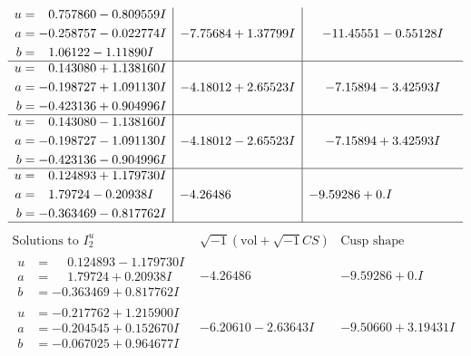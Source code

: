 \documentclass[1p]{elsarticle_modified}
\theoremstyle{definition}
\newcommand{\I}{\sqrt{-1}}
\begin{document}
$$\begin{array}{c|c|c}
\begin{aligned}
u &= \phantom{-}0.757860 - 0.809559 I \\
a &= -0.258757 - 0.022774 I \\
b &= \phantom{-}1.06122 - 1.11890 I\end{aligned}
 & -7.75684 + 1.37799 I & -11.45551 - 0.55128 I \\ \hline\begin{aligned}
u &= \phantom{-}0.143080 + 1.138160 I \\
a &= -0.198727 + 1.091130 I \\
b &= -0.423136 + 0.904996 I\end{aligned}
 & -4.18012 + 2.65523 I & -7.15894 - 3.42593 I \\ \hline\begin{aligned}
u &= \phantom{-}0.143080 - 1.138160 I \\
a &= -0.198727 - 1.091130 I \\
b &= -0.423136 - 0.904996 I\end{aligned}
 & -4.18012 - 2.65523 I & -7.15894 + 3.42593 I \\ \hline\begin{aligned}
u &= \phantom{-}0.124893 + 1.179730 I \\
a &= \phantom{-}1.79724 - 0.20938 I \\
b &= -0.363469 - 0.817762 I\end{aligned}
 & -4.26486\phantom{ +0.000000I} & -9.59286 + 0. I\phantom{ +0.000000I}\\
 \hline 
 \end{array}$$\newpage$$\begin{array}{c|c|c}  
\text{Solutions to }I^u_{2}& \I (\text{vol} + \sqrt{-1}CS) & \text{Cusp shape}\\
 \hline 
\begin{aligned}
u &= \phantom{-}0.124893 - 1.179730 I \\
a &= \phantom{-}1.79724 + 0.20938 I \\
b &= -0.363469 + 0.817762 I\end{aligned}
 & -4.26486\phantom{ +0.000000I} & -9.59286 + 0. I\phantom{ +0.000000I} \\ \hline\begin{aligned}
u &= -0.217762 + 1.215900 I \\
a &= -0.204545 + 0.152670 I \\
b &= -0.067025 + 0.964677 I\end{aligned}
 & -6.20610 - 2.63643 I & -9.50660 + 3.19431 I \\ \hline\begin{aligned}

\end{aligned}
\end{array}$$
\end{document}
